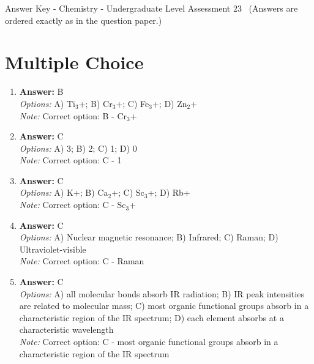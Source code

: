 \documentclass[12pt]{article}
\begin{document}
\begin{center}
Answer Key - Chemistry - Undergraduate Level Assessment 23 \
\small (Answers are ordered exactly as in the question paper.)
\end{center}

\section*{Multiple Choice}
\begin{enumerate}[label=\arabic*.]
\item \textbf{Answer:} B
\\ \textit{Options:} A) Ti$_{3}$+; B) Cr$_{3}$+; C) Fe$_{3}$+; D) Zn$_{2}$+
\\ \textit{Note:} Correct option: B - Cr$_{3}$+
\item \textbf{Answer:} C
\\ \textit{Options:} A) 3; B) 2; C) 1; D) 0
\\ \textit{Note:} Correct option: C - 1
\item \textbf{Answer:} C
\\ \textit{Options:} A) K+; B) Ca$_{2}$+; C) Sc$_{3}$+; D) Rb+
\\ \textit{Note:} Correct option: C - Sc$_{3}$+
\item \textbf{Answer:} C
\\ \textit{Options:} A) Nuclear magnetic resonance; B) Infrared; C) Raman; D) Ultraviolet-visible
\\ \textit{Note:} Correct option: C - Raman
\item \textbf{Answer:} C
\\ \textit{Options:} A) all molecular bonds absorb IR radiation; B) IR peak intensities are related to molecular mass; C) most organic functional groups absorb in a characteristic region of the IR spectrum; D) each element absorbs at a characteristic wavelength
\\ \textit{Note:} Correct option: C - most organic functional groups absorb in a characteristic region of the IR spectrum
\end{enumerate}
\end{document}
